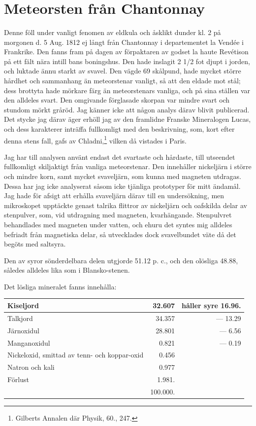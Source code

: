 \documentclass[a4paper, 12pt, oneside, swedish]{article}
\begin{document}
\section{Meteorsten från Chantonnay}
\paragraph{}
Denne föll under vanligt fenomen av eldkula och åsklikt dunder kl. 2 på morgonen d. 5 Aug. 1812 ej långt från Chantonnay i departementet la Vendée i Frankrike. Den fanns fram på dagen av förpaktaren av godset la haute Revétison på ett fält nära intill bans boningshus. Den hade inslagit 2 1/2 fot djupt i jorden, och luktade ännu starkt av svavel. Den vägde 69 skålpund, hade mycket större hårdhet och sammanhang än meteorstenar vanligt, så att den eldade mot stål; dess brottyta hade mörkare färg än meteorstenars vanliga, och på sina ställen var den alldeles svart. Den omgivande förglasade skorpan var mindre svart och stundom mörkt gråröd. Jag känner icke att någon analys därav blivit publicerad. Det stycke jag därav äger erhöll jag av den framlidne Franske Mineralogen Lucas, och dess karakterer inträffa fullkomligt med den beskrivning, som, kort efter denna stens fall, gafs av Chladni,\footnote{Gilberts Annalen där Physik, 60., 247.} vilken då vistades i Paris.

Jag har till analysen använt endast det svartaste och hårdaste, till utseendet fullkomligt skiljaktigt från vanliga meteorstenar. Den innehåller nickeljärn i större och mindre korn, samt mycket svaveljärn, som kunna med magneten utdragas. Dessa har jag icke analyserat såsom icke tjänliga prototyper för mitt ändamål. Jag hade för afsigt att erhålla svaveljärn därav till en undersökning, men mikroskopet upptäckte genast talrika flittror av nickeljärn och oafskilda delar av stenpulver, som, vid utdragning med magneten, kvarhängande. Stenpulvret behandlades med magneten under vatten, och ehuru det syntes mig alldeles befriadt från magnetiska delar, så utvecklades dock svavelbundet väte då det begöts med saltsyra.

Den av syror sönderdelbara delen utgjorde 51.12 p. c., och den olösliga 48.88, således alldeles lika som i Blansko-stenen.

Det lösliga mineralet fanns innehålla:
\begin{table}[H]
    \centering\small
    \begin{tabular}{|l|r|r|}
    \hline
        Kiseljord & 32.607 & håller syre 16.96. \\ \hline
        Talkjord & 34.357 & --- 13.29 \\ \hline
        Järnoxidul & 28.801 & --- 6.56 \\ \hline
        Manganoxidul & 0.821 & --- 0.19 \\ \hline
        Nickeloxid, smittad av tenn- och koppar-oxid & 0.456 & ~ \\ \hline
        Natron och kali & 0.977 & ~ \\ \hline
        Förlust & 1.981. & ~ \\ \hline
        ~ & 100.000. & ~ \\ \hline
    \end{tabular}
\end{table}
\end{document}

